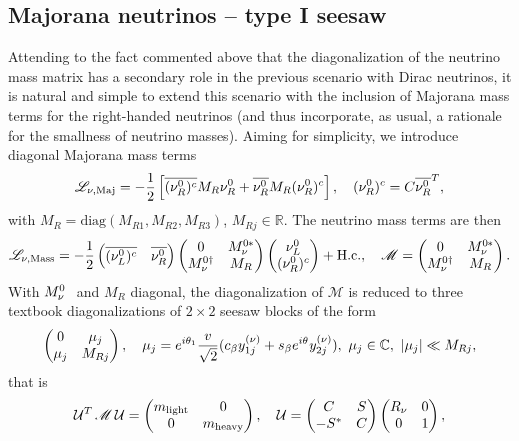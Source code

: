 \documentclass[12pt,a4paper]{article}
\begin{document}
\subsection{Majorana neutrinos -- type I seesaw\label{sSEC:Majorana}}
Attending to the fact commented above that the diagonalization of the neutrino mass matrix has a secondary role in the previous scenario with Dirac neutrinos, it is natural and simple to extend this scenario with the inclusion of Majorana mass terms for the right-handed neutrinos (and thus incorporate, as usual, a rationale for the smallness of neutrino masses). Aiming for simplicity, we introduce diagonal Majorana mass terms
\begin{equation}\label{eq:MajoranaMassTerm:00}
 \mathscr L_{\rm \nu,Maj}=-\frac{1}{2}\left[\overline{(\nu_R^0)^c} M_R \nu_R^0+\overline{\nu_R^0}M_R(\nu_R^0)^c\right],\quad (\nu_R^0)^c=C\overline{\nu_R^0}^T,
\end{equation}
with $M_R=\text{diag}(M_{R1},M_{R2},M_{R3})$, $M_{Rj}\in\mathbb{R}$.
The neutrino mass terms are then
\begin{equation}\label{eq:MajoranaMassTerm:01}
 \mathscr L_{\rm \nu,Mass}= -\frac{1}{2}\begin{pmatrix}\overline{(\wNuL)^c} & \overline{\wNR}\end{pmatrix}\begin{pmatrix} 0 & \wMNc\\ \wMNd & M_R\end{pmatrix}\begin{pmatrix}\wNuL\\ (\wNR)^c\end{pmatrix} + \Hc,\quad \mathscr M=\begin{pmatrix} 0 & \wMNc\\ \wMNd & M_R\end{pmatrix}.
\end{equation}
With $\wMN$ and $M_R$ diagonal, the diagonalization of $\mathscr M$ is reduced to three textbook diagonalizations of $2\times 2$ seesaw blocks of the form
\begin{equation}
 \begin{pmatrix} 0 & \mu_j\\ \mu_j & M_{Rj}\end{pmatrix},\quad \mu_j = e^{i\theta_{1}}\frac{v_{}}{\sqrt 2}(c_\beta y_{1j}^{\rm (\nu)}+s_\beta e^{i\theta_{}}y_{2j}^{\rm (\nu)}),\ \mu_j\in\mathbb{C},\ |\mu_j|\ll M_{Rj},
\end{equation}
that is
\begin{equation}\label{eq:MajoranaDiagon:00}
 \mathcal U^T\,\mathscr M\,\mathcal U=\begin{pmatrix}m_{\rm light}& 0\\ 0& m_{\rm heavy}\end{pmatrix},\quad \mathcal U=\begin{pmatrix}C & S\\ -S^\ast & C\end{pmatrix}\begin{pmatrix}R_\nu&0\\ 0&1\end{pmatrix},
\end{equation}
\end{document}
